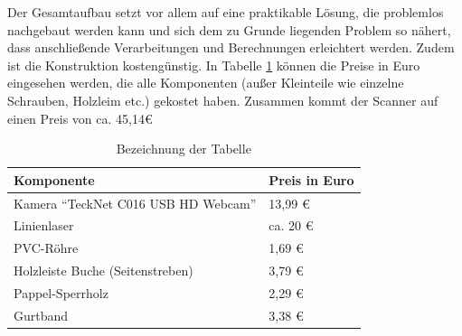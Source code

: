 Der Gesamtaufbau setzt vor allem auf eine praktikable Lösung, die problemlos nachgebaut werden kann und sich dem zu Grunde liegenden Problem so nähert, dass anschließende Verarbeitungen und Berechnungen erleichtert werden. Zudem ist die Konstruktion kostengünstig. In Tabelle \ref{tab:preise} können die Preise in Euro eingesehen werden, die alle Komponenten (außer Kleinteile wie einzelne Schrauben, Holzleim etc.) gekostet haben. Zusammen kommt der Scanner auf einen Preis von ca. 45,14\euro

\begin{table} %
	\centering
		\begin{tabular}{l | l}
		\textbf{Komponente} & \textbf{Preis in Euro}\\
		\hline
			Kamera "`TeckNet C016 USB HD Webcam"' & 13,99 \euro\\
			Linienlaser &  ca. 20 \euro\\
			PVC-Röhre & 1,69 \euro\\
			Holzleiste Buche (Seitenstreben) & 3,79 \euro\\
			Pappel-Sperrholz &  2,29 \euro\\
			Gurtband & 3,38 \euro
		\end{tabular}
	\caption{Bezeichnung der Tabelle}
	\label{tab:preise}
\end{table}


